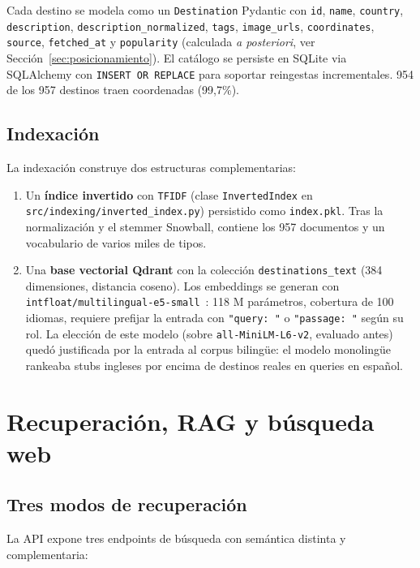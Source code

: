 \documentclass[runningheads,a4paper]{llncs}
\begin{document}
Cada destino se modela como un \texttt{Destination} Pydantic con \texttt{id}, \texttt{name}, \texttt{country}, \texttt{description}, \texttt{description\_normalized}, \texttt{tags}, \texttt{image\_urls}, \texttt{coordinates}, \texttt{source}, \texttt{fetched\_at} y \texttt{popularity} (calculada \emph{a posteriori}, ver Secci\'on~\ref{sec:posicionamiento}). El cat\'alogo se persiste en SQLite via SQLAlchemy con \texttt{INSERT OR REPLACE} para soportar reingestas incrementales. 954 de los 957 destinos traen coordenadas (99{,}7\%).

\subsection{Indexaci\'on}

La indexaci\'on construye dos estructuras complementarias:

\begin{enumerate}
\item Un \textbf{\'indice invertido} con \texttt{TF\textendash IDF} (clase \texttt{InvertedIndex} en \texttt{src/indexing/inverted\_index.py}) persistido como \texttt{index.pkl}. Tras la normalizaci\'on y el stemmer Snowball, contiene los 957 documentos y un vocabulario de varios miles de tipos.
\item Una \textbf{base vectorial Qdrant} con la colecci\'on \texttt{destinations\_text} (384 dimensiones, distancia coseno). Los embeddings se generan con \texttt{intfloat/multilingual-e5-small}~\cite{wang2024e5}: 118 M par\'ametros, cobertura de 100 idiomas, requiere prefijar la entrada con \texttt{"query: "} o \texttt{"passage: "} seg\'un su rol. La elecci\'on de este modelo (sobre \texttt{all-MiniLM-L6-v2}, evaluado antes) qued\'o justificada por la entrada al corpus bilingüe: el modelo monolingüe rankeaba stubs ingleses por encima de destinos reales en queries en espa\~nol.
\end{enumerate}

\section{Recuperaci\'on, RAG y b\'usqueda web}

\subsection{Tres modos de recuperaci\'on}

La API expone tres endpoints de b\'usqueda con sem\'antica distinta y complementaria:
\end{document}
